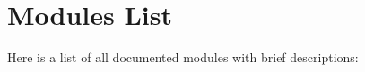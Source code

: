 \section{Modules List}
Here is a list of all documented modules with brief descriptions\+:\begin{DoxyCompactList}
\item{}
\item{}
\end{DoxyCompactList}
